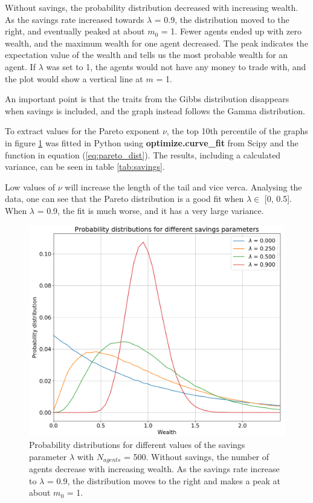 \documentclass[11pt,a4paper,titlepage]{article}
\begin{document}
Without savings, the probability distribution decreased with increasing wealth. As the savings rate increased towards $\lambda$ = 0.9, the distribution moved to the right, and eventually peaked at about $m_0$ = 1. Fewer agents ended up with zero wealth, and the maximum wealth for one agent decreased. The peak indicates the expectation value of the wealth and tells us the most probable wealth for an agent. If $\lambda$ was set to 1, the agents would not have any money to trade with, and the plot would show a vertical line at $m$ = 1. 
 
An important point is that the traits from the Gibbs distribution disappears when savings is included, and the graph instead follows the Gamma distribution.

To extract values for the Pareto exponent $\nu$, the top 10th percentile of the graphs in figure \ref{fig:c_prob_dist} was fitted in Python using \textbf{optimize.curve\_fit} from Scipy and the function in equation (\ref{eq:pareto_dist}). The results, including a calculated variance, can be seen in table \ref{tab:savings}.

Low values of $\nu$ will increase the length of the tail and vice verca. Analysing the data, one can see that the Pareto distribution is a good fit when $\lambda \in$ [0, 0.5]. When $\lambda$ = 0.9, the fit is much worse, and it has a very large variance. 


\begin{figure}[h!]
\centering
\includegraphics[scale=0.3]{task_c_prob_dist_agents_500_MCC_1000_N_trans_10000000.png}
\caption{ Probability distributions for different values of the savings parameter $\lambda$ with $N_{agents}$ = 500. Without savings, the number of agents decrease with increasing wealth. As the savings rate increase to $\lambda$ = 0.9, the distribution moves to the right and makes a peak at about $m_0$ = 1.  \label{fig:c_prob_dist}}
\end{figure}
\end{document}

